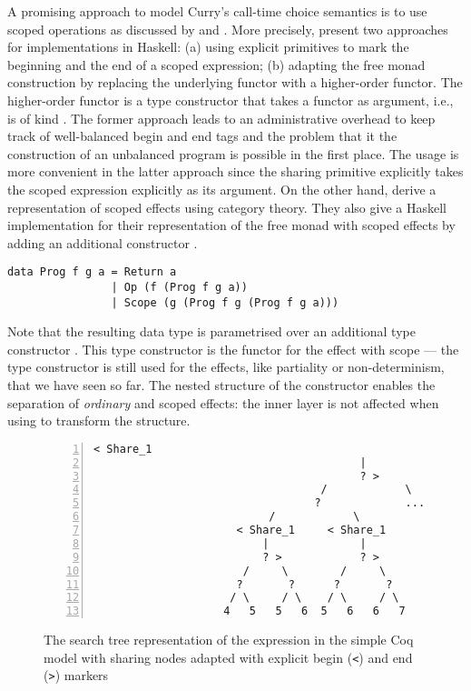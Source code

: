 A promising approach to model Curry's call\--time choice semantics is to use scoped operations as discussed by \citet{wu2014effect} and \citet{pirog2018syntax}.
More precisely, \citeauthor{wu2014effect} present two approaches for implementations in Haskell: (a) using explicit primitives to mark the beginning and the end of a scoped expression; (b) adapting the free monad construction by replacing the underlying functor with a higher\--order functor.
The higher\--order functor is a type constructor that takes a functor as argument, i.e., is of kind \hinl{(* -> *) -> * -> *}.
The former approach leads to an administrative overhead to keep track of well\--balanced begin and end tags and the problem that it the construction of an unbalanced program is possible in the first place.
The usage is more convenient in the latter approach since the sharing primitive explicitly takes the scoped expression explicitly as its argument.
On the other hand, \citeauthor{pirog2018syntax} derive a representation of scoped effects using category theory.
They also give a Haskell implementation for their representation of the free monad with scoped effects by adding an additional constructor .

\begin{verbatim}
data Prog f g a = Return a
                | Op (f (Prog f g a))
                | Scope (g (Prog f g (Prog f g a)))
\end{verbatim}

Note that the resulting data type  is parametrised over an additional type constructor .
This type constructor is the functor for the effect with scope --- the type constructor  is still used for the effects, like partiality or non\--determinism, that we have seen so far.
The nested structure of the  constructor enables the separation of \emph{ordinary} and scoped effects: the inner  layer is not affected when using \hinl{(>>=)} to transform the structure.

\begin{figure}[tb]
 \centering
\begin{Verbatim}[numbers=left, xleftmargin=5mm]
                                     < Share_1
                                         |
                                         ? >
                                   /            \
                                  ?             ...
                           /            \
                      < Share_1     < Share_1
                          |              |
                          ? >            ? >
                       /     \        /     \
                      ?       ?      ?       ?
                     / \     / \    / \     / \
                    4   5   5   6  5   6   6   7
\end{Verbatim}
\caption{The search tree representation of the expression  in the simple Coq model with sharing nodes adapted with explicit begin (\texttt{<}) and end (\texttt{>}) markers}
\label{fig:searchTreeScope}
\end{figure}

